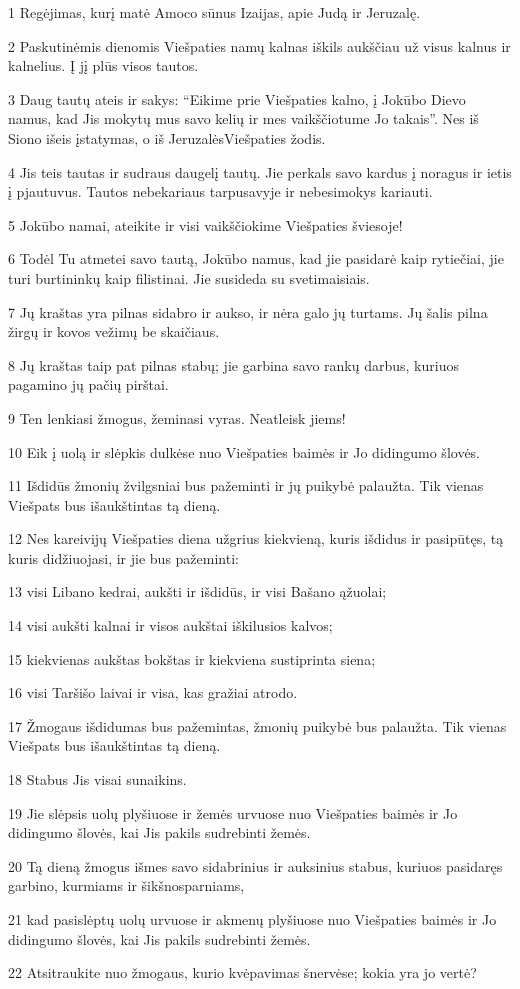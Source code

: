 \par 1 Regėjimas, kurį matė Amoco sūnus Izaijas, apie Judą ir Jeruzalę. 
\par 2 Paskutinėmis dienomis Viešpaties namų kalnas iškils aukščiau už visus kalnus ir kalnelius. Į jį plūs visos tautos. 
\par 3 Daug tautų ateis ir sakys: “Eikime prie Viešpaties kalno, į Jokūbo Dievo namus, kad Jis mokytų mus savo kelių ir mes vaikščiotume Jo takais”. Nes iš Siono išeis įstatymas, o iš Jeruzalės­Viešpaties žodis. 
\par 4 Jis teis tautas ir sudraus daugelį tautų. Jie perkals savo kardus į noragus ir ietis į pjautuvus. Tautos nebekariaus tarpusavyje ir nebesimokys kariauti. 
\par 5 Jokūbo namai, ateikite ir visi vaikščiokime Viešpaties šviesoje! 
\par 6 Todėl Tu atmetei savo tautą, Jokūbo namus, kad jie pasidarė kaip rytiečiai, jie turi burtininkų kaip filistinai. Jie susideda su svetimaisiais. 
\par 7 Jų kraštas yra pilnas sidabro ir aukso, ir nėra galo jų turtams. Jų šalis pilna žirgų ir kovos vežimų be skaičiaus. 
\par 8 Jų kraštas taip pat pilnas stabų; jie garbina savo rankų darbus, kuriuos pagamino jų pačių pirštai. 
\par 9 Ten lenkiasi žmogus, žeminasi vyras. Neatleisk jiems! 
\par 10 Eik į uolą ir slėpkis dulkėse nuo Viešpaties baimės ir Jo didingumo šlovės. 
\par 11 Išdidūs žmonių žvilgsniai bus pažeminti ir jų puikybė palaužta. Tik vienas Viešpats bus išaukštintas tą dieną. 
\par 12 Nes kareivijų Viešpaties diena užgrius kiekvieną, kuris išdidus ir pasipūtęs, tą kuris didžiuojasi, ir jie bus pažeminti: 
\par 13 visi Libano kedrai, aukšti ir išdidūs, ir visi Bašano ąžuolai; 
\par 14 visi aukšti kalnai ir visos aukštai iškilusios kalvos; 
\par 15 kiekvienas aukštas bokštas ir kiekviena sustiprinta siena; 
\par 16 visi Taršišo laivai ir visa, kas gražiai atrodo. 
\par 17 Žmogaus išdidumas bus pažemintas, žmonių puikybė bus palaužta. Tik vienas Viešpats bus išaukštintas tą dieną. 
\par 18 Stabus Jis visai sunaikins. 
\par 19 Jie slėpsis uolų plyšiuose ir žemės urvuose nuo Viešpaties baimės ir Jo didingumo šlovės, kai Jis pakils sudrebinti žemės. 
\par 20 Tą dieną žmogus išmes savo sidabrinius ir auksinius stabus, kuriuos pasidaręs garbino, kurmiams ir šikšnosparniams, 
\par 21 kad pasislėptų uolų urvuose ir akmenų plyšiuose nuo Viešpaties baimės ir Jo didingumo šlovės, kai Jis pakils sudrebinti žemės. 
\par 22 Atsitraukite nuo žmogaus, kurio kvėpavimas šnervėse; kokia yra jo vertė?




